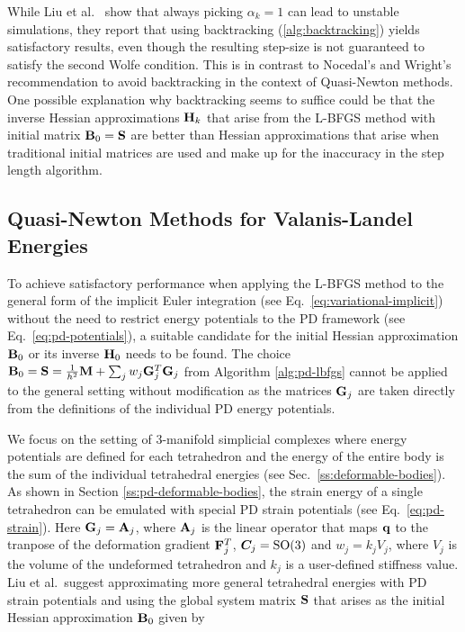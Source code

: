 While Liu et al.\ \cite{liu2017} show that always picking $\alpha_k = 1$ can lead to
unstable simulations, they report that using backtracking (\cref{alg:backtracking}) yields satisfactory results, even though 
the resulting step-size is not guaranteed to satisfy the second Wolfe condition. This is in contrast to Nocedal's and Wright's
recommendation \cite{nocedal2006} to avoid backtracking in the context of  Quasi-Newton methods. One possible explanation why 
backtracking seems to suffice could be that the inverse 
Hessian approximations $\mathbf{H}_k$ that arise from the L-BFGS method with initial matrix $\mathbf{B}_0 = \mathbf{S}$ are better than
Hessian approximations that arise when traditional initial matrices are used and make up for the inaccuracy in the step length
algorithm.

\subsection{Quasi-Newton Methods for Valanis-Landel Energies}\label{ss:qn-valanis-landel}
To achieve satisfactory performance when applying the L-BFGS method to the general form of the implicit Euler integration 
(see Eq.\ \ref{eq:variational-implicit}) without the need to restrict energy potentials to the PD framework (see Eq.\ \ref{eq:pd-potentials}), a suitable
candidate for the initial Hessian approximation $\mathbf{B}_0$ or its inverse $\mathbf{H}_0$ needs to be found. The choice $\mathbf{B}_0 = 
\mathbf{S} = \frac{1}{h^2}\mathbf{M} + \sum_j w_j \mathbf{G}_j^T \mathbf{G}_j$ from Algorithm \ref{alg:pd-lbfgs} cannot be applied to the general setting 
without modification as the matrices $\mathbf{G}_j$ are taken directly from the definitions of the individual PD energy potentials.

We focus on the setting of 3-manifold simplicial complexes where energy potentials are defined for each tetrahedron and the
energy of the entire body is the sum of the individual tetrahedral energies (see Sec.\ \ref{ss:deformable-bodies}).
As shown in Section \ref{ss:pd-deformable-bodies}, the strain energy of a single tetrahedron can be emulated with special PD strain 
potentials (see Eq.\ \ref{eq:pd-strain}). Here $\mathbf{G}_j = \mathbf{A}_j$, where $\mathbf{A}_j$ is the linear operator that maps $\mathbf{q}$ 
to the tranpose of the deformation gradient $\mathbf{F}^T_j$, $\bm{C}_j = \text{SO}(3)$ and $w_j = k_jV_j$, where $V_j$ is the
volume of the undeformed tetrahedron and $k_j$ is a user-defined stiffness value. 
Liu et al.\ suggest approximating more general tetrahedral energies with PD strain potentials and using the global system
matrix $\mathbf{S}$ that arises as the initial Hessian approximation $\mathbf{B}_0$ given by


